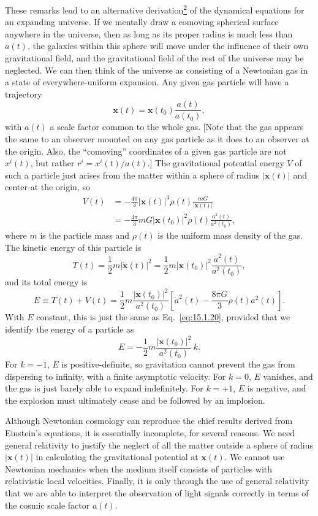 These remarks lead to an alternative
derivation\hyperref[ch15-ref-2]{\textsuperscript{2}} of the dynamical equations
for an expanding universe. If we mentally draw a comoving spherical surface
anywhere in the universe, then as long as its proper radius is much less than
\(a(t)\), the galaxies within this sphere will move under the influence of
their own gravitational field, and the gravitational field of the rest of the
universe may be neglected. We can then think of the universe as consisting of
a Newtonian gas in a state of everywhere-uniform expansion. Any given gas
particle will have a trajectory
\[
  \mathbf{x}(t)
  =\mathbf{x}(t_0)\frac{a(t)}{a(t_0)},
\]
with \(a(t)\) a scale factor common to the whole gas. [Note that the gas
appears the same to an observer mounted on any gas particle as it does to an
observer at the origin. Also, the ``comoving'' coordinates of a given gas
particle are not \(x^i(t)\), but rather
\(r^i=x^i(t)/a(t)\).] The gravitational potential energy \(V\) of such a
particle just arises from the matter within a sphere of radius
\(\lvert\mathbf{x}(t)\rvert\) and center at the origin, so
\begin{align*}
  V(t)
  &=-\frac{4\pi}{3}\lvert\mathbf{x}(t)\rvert^3\rho(t)
    \frac{mG}{\lvert\mathbf{x}(t)\rvert}\\
  &=-\frac{4\pi}{3}mG\lvert\mathbf{x}(t_0)\rvert^2\rho(t)
    \frac{a^2(t)}{a^2(t_0)},
\end{align*}
where \(m\) is the particle mass and \(\rho(t)\) is the uniform mass
density of the gas. The kinetic energy of this particle is
\[
  T(t)
  =\frac12m\lvert\dot{\mathbf{x}}(t)\rvert^2
  =\frac12m\lvert\mathbf{x}(t_0)\rvert^2
    \frac{\dot a^2(t)}{a^2(t_0)},
\]
and its total energy is
\[
  E\equiv T(t)+V(t)
  =\frac12m\frac{\lvert\mathbf{x}(t_0)\rvert^2}{a^2(t_0)}
    \left[
      \dot a^2(t)-\frac{8\pi G}{3}\rho(t)a^2(t)
    \right].
\]
With \(E\) constant, this is just the same as Eq.~\eqref{eq:15.1.20},
provided that we identify the energy of a particle as
\begin{equation}
  E
  =-\frac12m\frac{\lvert\mathbf{x}(t_0)\rvert^2}{a^2(t_0)}\,k.
  \tag{15.1.26}\label{eq:15.1.26}
\end{equation}
For \(k=-1\), \(E\) is positive-definite, so gravitation cannot prevent
the gas from dispersing to infinity, with a finite asymptotic velocity. For
\(k=0\), \(E\) vanishes, and the gas is just barely able to expand
indefinitely. For \(k=+1\), \(E\) is negative, and the explosion must
ultimately cease and be followed by an implosion.

Although Newtonian cosmology can reproduce the chief results derived from
Einstein's equations, it is essentially incomplete, for several reasons. We
need general relativity to justify the neglect of all the matter outside a sphere
of radius \(\lvert\mathbf{x}(t)\rvert\) in calculating the gravitational
potential at \(\mathbf{x}(t)\). We cannot use Newtonian mechanics when the
medium itself consists of particles with relativistic local velocities.
Finally, it is only through the use of general relativity that we are able to
interpret the observation of light signals correctly in terms of the cosmic
scale factor \(a(t)\).
